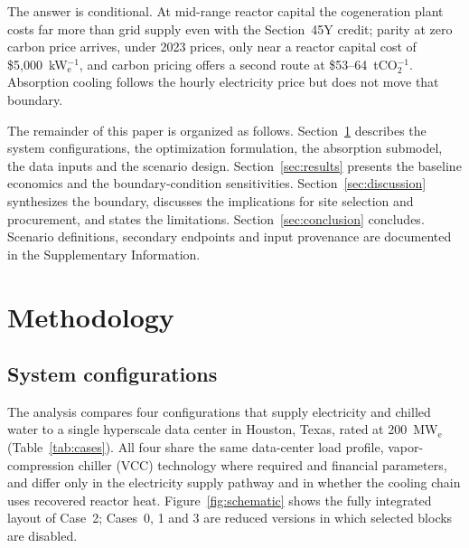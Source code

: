 \documentclass[a4paper,fleqn]{cas-sc}
\begin{document}
The answer is conditional. At mid-range reactor capital the cogeneration plant costs far more than grid supply even with the Section~45Y credit; parity at zero carbon price arrives, under 2023 prices, only near a reactor capital cost of \$5{,}000~kW$_\mathrm{e}^{-1}$, and carbon pricing offers a second route at \$53--64~tCO$_2^{-1}$. Absorption cooling follows the hourly electricity price but does not move that boundary.

The remainder of this paper is organized as follows. Section~\ref{sec:methods} describes the system configurations, the optimization formulation, the absorption submodel, the data inputs and the scenario design. Section~\ref{sec:results} presents the baseline economics and the boundary-condition sensitivities. Section~\ref{sec:discussion} synthesizes the boundary, discusses the implications for site selection and procurement, and states the limitations. Section~\ref{sec:conclusion} concludes. Scenario definitions, secondary endpoints and input provenance are documented in the Supplementary Information.


\section{Methodology}
\label{sec:methods}

\subsection{System configurations}
\label{sec:methods:system}

The analysis compares four configurations that supply electricity and chilled water to a single hyperscale data center in Houston, Texas, rated at 200~MW$_\mathrm{e}$ (Table~\ref{tab:cases}). All four share the same data-center load profile, vapor-compression chiller (VCC) technology where required and financial parameters, and differ only in the electricity supply pathway and in whether the cooling chain uses recovered reactor heat. Figure~\ref{fig:schematic} shows the fully integrated layout of Case~2; Cases~0, 1 and 3 are reduced versions in which selected blocks are disabled.
\end{document}
